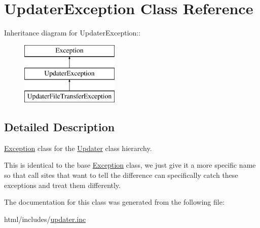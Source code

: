 \hypertarget{classUpdaterException}{
\section{UpdaterException Class Reference}
\label{classUpdaterException}
}
Inheritance diagram for UpdaterException::\begin{figure}[H]
\begin{center}
\leavevmode
\includegraphics[height=3cm]{classUpdaterException}
\end{center}
\end{figure}


\subsection{Detailed Description}
\hyperlink{classException}{Exception} class for the \hyperlink{classUpdater}{Updater} class hierarchy.

This is identical to the base \hyperlink{classException}{Exception} class, we just give it a more specific name so that call sites that want to tell the difference can specifically catch these exceptions and treat them differently. 

The documentation for this class was generated from the following file:\begin{DoxyCompactItemize}
\item 
html/includes/\hyperlink{updater_8inc}{updater.inc}\end{DoxyCompactItemize}
